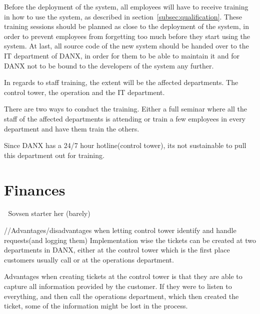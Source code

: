 Before the deployment of the system, all employees will have to receive training in how to use the system, as described in section~\ref{subsec:qualification}. These training sessions should be planned as close to the deployment of the system, in order to prevent employees from forgetting too much before they start using the system.
At last, all source code of the new system should be handed over to the IT department of DANX, in order for them to be able to maintain it and for DANX not to be bound to the developers of the system any further.







In regards to staff training, the extent will be the affected departments. The control tower, the operation and the IT department.

There are two ways to conduct the training. Either a full seminar where all the staff of the affected departments is attending or train a few employees in every department and have them train the others.

Since DANX has a 24/7 hour hotline(control tower), its not sustainable to pull this department out for training.


\section{Finances}


Sovsen starter her (barely)

//Advantages/disadvantages when letting control tower identify and handle requests(and logging them)
Implementation wise the tickets can be created at two departments in DANX, either at the control tower which is the first place customers usually call or at the operations department.

Advantages when creating tickets at the control tower is that they are able to capture all information provided by the customer. If they were to listen to everything, and then call the operations department, which then created the ticket, some of the information might be lost in the process.
